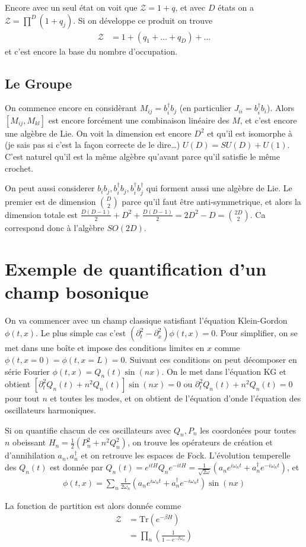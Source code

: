 \documentclass[10pt]{report}
\begin{document}
Encore avec un seul \'etat on voit que $\mathcal{Z} = 1 + q$, et avec $D$ \'etats on a $\mathcal{Z} = \prod^D \left( 1 + q_j \right)$. Si on d\'eveloppe ce produit on trouve 
\begin{align}
    \mathcal{Z} &= 1 + \left( q_1 +\dots + q_D \right) + \dots
\end{align}
et c'est encore la base du nombre d'occupation.

\subsection{Le Groupe}

On commence encore en consid\`erant $M_{ij} = b_i^\dagger b_j$ (en particulier $J_{ii} = b_i^\dagger b_i$). Alors $\left[ M_{ij}, M_{kl} \right]$ est encore forc\'ement une combinaison lin\'eaire des $M$, et c'est encore une alg\`ebre de Lie. On voit la dimension est encore $D^2$ et qu'il est isomorphe \`a (je sais pas si c'est la fa\c{c}on correcte de le dire\dots) $U(D) = SU(D) + U(1)$. C'est naturel qu'il est la m\^eme alg\`ebre qu'avant parce qu'il satisfie le m\^eme crochet.

On peut aussi considerer $b_ib_j, b_i^\dagger b_j, b_i^\dagger b_j^\dagger$ qui forment aussi une alg\`ebre de Lie. Le premier est de dimension $\binom{D}{2}$ parce qu'il faut \^etre anti-symmetrique, et alors la dimension totale est $\frac{D(D-1)}{2} + D^2 + \frac{D(D - 1)}{2} = 2D^2 - D = \binom{2D}{2}$. Ca correspond donc \`a l'alg\`ebre $SO(2D)$.

\section{Exemple de quantification d'un champ bosonique}

On va commencer avec un champ classique satisfiant l'\'equation Klein-Gordon $\phi(t,x)$. Le plus simple cas c'est $(\partial_t^2 - \partial_x^2)\phi(t,x) = 0$. Pour simplifier, on se met dans une bo\^ite et impose des conditions limites en $x$ comme $\phi(t,x=0) = \phi(t,x=L) = 0$. Suivant ces conditions on peut d\'ecomposer en s\'erie Fourier $\phi(t,x) = Q_n(t)\sin(nx)$. On le met dans l'\'equation KG et obtient $\left[\partial^2_t Q_n(t) + n^2Q_n(t)\right]\sin (nx) = 0$ ou $\partial_t^2 Q_n(t) + n^2Q_n(t) = 0$ pour tout $n$ et toutes les modes, et on obtient de l'\'equation d'onde l'\'equation des oscillateurs harmoniques.

Si on quantifie chacun de ces oscillateurs avec $Q_n, P_n$ les coordon\'ees pour toutes $n$ obeissant $H_n = \frac{1}{2}\left( P_n^2 + n^2Q_n^2 \right)$, on trouve les op\'erateurs de cr\'eation et d'annihilation $a_n, a_n^\dagger$ et on retrouve les espaces de Fock. L'\'evolution temperelle des $Q_n(t)$ est donn\'ee par $Q_n(t) = e^{itH}Q_ne^{-itH} = \frac{1}{\sqrt{2\omega}}\left( a_ne^{i\omega_n t} + a_n^\dagger e^{-i\omega_nt} \right)$, et
\begin{align}
    \phi(t,x) = \sum\limits_{n}^{}\frac{1}{2\omega_n} \left( a_ne^{i\omega_nt} + a_n^\dagger e^{-i\omega_n t} \right)\sin (nx)
\end{align}

La fonction de partition est alors donn\'ee comme
\begin{align}
    \mathcal{Z} &= \mathrm{Tr} \left( e^{-\beta H} \right)\\
    &= \prod_n \left( \frac{1}{1 - e^{-\beta \omega_n}} \right)
\end{align}
\end{document}
